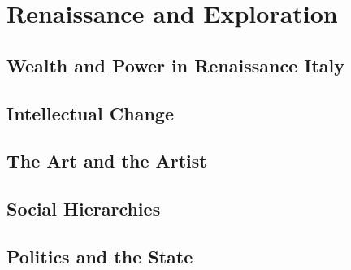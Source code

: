\documentclass[../euro.tex]{subfiles}
\begin{document}
\chapter{Renaissance and Exploration}
\section{Wealth and Power in Renaissance Italy}
\section{Intellectual Change}
\section{The Art and the Artist}
\section{Social Hierarchies}
\section{Politics and the State}
\end{document}
